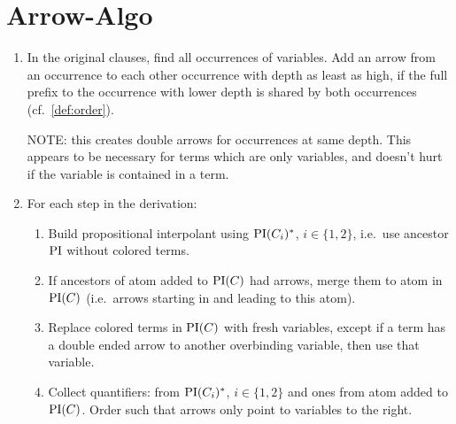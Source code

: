 \clearpage
\section{Arrow-Algo}

\begin{enumerate}
	\item In the original clauses, find all occurrences of variables. Add an arrow from an occurrence to each other occurrence with depth as least as high, if the full prefix to the occurrence with lower depth is shared by both occurrences (cf.~\ref{def:order}).  

		NOTE: this creates double arrows for occurrences at same depth. This appears to be necessary for terms which are only variables, and doesn't hurt if the variable is contained in a term.

		\item For each step in the derivation:
			\begin{enumerate}
				\item Build propositional interpolant using $\mathrm{PI}(C_i)^*$, $i\in \{1,2\}$, i.e.~use ancestor $\mathrm{PI}$ without colored terms.
				\item If ancestors of atom added to $\mathrm{PI}(C)$ had arrows, merge them to atom in $\mathrm{PI}(C)$ (i.e.~arrows starting in and leading to this atom).
				\item Replace colored terms in $\mathrm{PI}(C)$ with fresh variables, except if a term has a double ended arrow to another overbinding variable, then use that variable.
				\item Collect quantifiers: from $\mathrm{PI}(C_i)^*$, $i\in \{1,2\}$ and ones from atom added to $\mathrm{PI}(C)$. Order such that arrows only point to variables to the right.
			\end{enumerate}
\end{enumerate}


